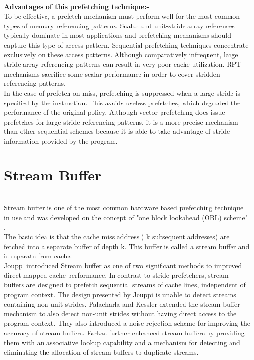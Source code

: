 \documentclass{article}
\begin{document}
\\\textbf{Advantages of this prefetching technique:-}
\\To be effective, a prefetch mechanism must perform well for the most common types of memory referencing patterns. Scalar and unit-stride array references typically dominate in most applications and prefetching mechanisms should capture this type of access pattern. Sequential prefetching techniques concentrate exclusively on these access patterns. Although comparatively infrequent, large stride array referencing patterns can result in very poor cache utilization. RPT mechanisms sacrifice some scalar performance in order to cover stridden referencing patterns. 
\\In the case of prefetch-on-miss, prefetching is suppressed when a large stride is specified by the instruction. This avoids useless prefetches, which degraded the performance of the original policy. Although vector prefetching does issue prefetches for large stride referencing patterns, it is a more precise mechanism than other sequential schemes because it is able to take advantage of stride information provided by the program.
\section{Stream Buffer}
\\Stream buffer is one of the most common hardware based prefetching technique in use and was developed on the concept of "one block lookahead (OBL) scheme" .
\\The basic idea is that the cache miss address ( k subsequent addresses) are fetched into a separate buffer of depth k. This buffer is called a stream buffer and is separate from cache. 
\\Jouppi introduced Stream buffer as one of two significant methods to improved direct mapped cache performance. In contrast to stride prefetchers, stream buffers are designed to prefetch sequential streams of cache lines, independent of program context. The design presented by Jouppi is unable to detect streams containing non-unit strides. Palacharla and Kessler extended the stream buffer mechanism to also detect non-unit strides without having direct access to the program context. They also introduced a noise rejection scheme for improving the accuracy of stream buffers. Farkas further enhanced stream buffers by providing them with an associative lookup capability and a mechanism for detecting and eliminating the allocation of stream buffers to duplicate streams. 
\end{document}
